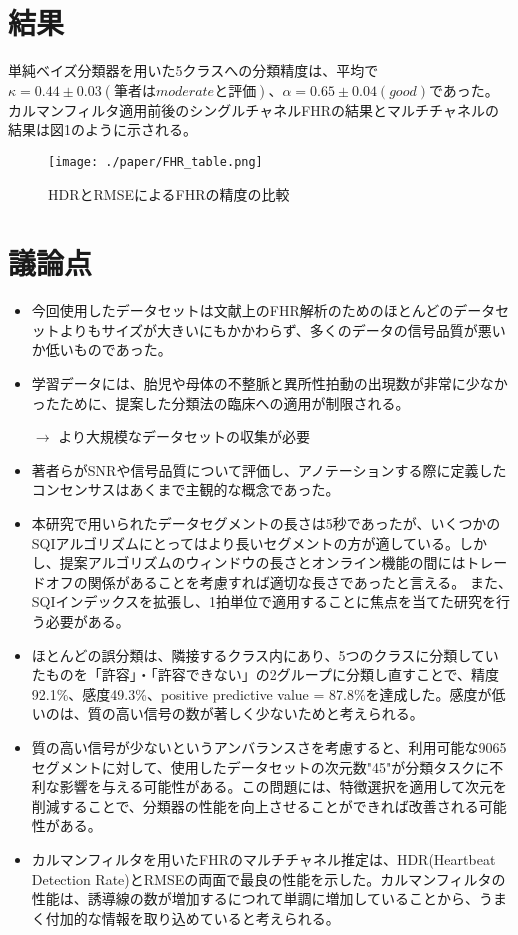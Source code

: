 \documentclass[dvipdfmx]{jsarticle}
\begin{document}
\section{結果}
単純ベイズ分類器を用いた5クラスへの分類精度は、平均で$\kappa = 0.44 \pm 0.03(筆者はmoderateと評価)、\alpha = 0.65 \pm 0.04(good)$であった。
カルマンフィルタ適用前後のシングルチャネルFHRの結果とマルチチャネルの結果は図1のように示される。

\begin{figure}[htbp]
\begin{center}
\texttt{[image: ./paper/FHR\_table.png]}
\end{center}
\caption{HDRとRMSEによるFHRの精度の比較}
\end{figure}

\section{議論点}
\begin{itemize}
    \item 今回使用したデータセットは文献上のFHR解析のためのほとんどのデータセットよりもサイズが大きいにもかかわらず、多くのデータの信号品質が悪いか低いものであった。
    \item  学習データには、胎児や母体の不整脈と異所性拍動の出現数が非常に少なかったために、提案した分類法の臨床への適用が制限される。

    $\rightarrow$ より大規模なデータセットの収集が必要
    \item 著者らがSNRや信号品質について評価し、アノテーションする際に定義したコンセンサスはあくまで主観的な概念であった。
    \item 本研究で用いられたデータセグメントの長さは5秒であったが、いくつかのSQIアルゴリズムにとってはより長いセグメントの方が適している。しかし、提案アルゴリズムのウィンドウの長さとオンライン機能の間にはトレードオフの関係があることを考慮すれば適切な長さであったと言える。
    また、SQIインデックスを拡張し、1拍単位で適用することに焦点を当てた研究を行う必要がある。
    \item ほとんどの誤分類は、隣接するクラス内にあり、5つのクラスに分類していたものを「許容」・「許容できない」の2グループに分類し直すことで、精度92.1\%、感度49.3\%、positive predictive value = 87.8\%を達成した。感度が低いのは、質の高い信号の数が著しく少ないためと考えられる。
    \item 質の高い信号が少ないというアンバランスさを考慮すると、利用可能な9065セグメントに対して、使用したデータセットの次元数"45"が分類タスクに不利な影響を与える可能性がある。この問題には、特徴選択を適用して次元を削減することで、分類器の性能を向上させることができれば改善される可能性がある。
    \item カルマンフィルタを用いたFHRのマルチチャネル推定は、HDR(Heartbeat Detection Rate)とRMSEの両面で最良の性能を示した。カルマンフィルタの性能は、誘導線の数が増加するにつれて単調に増加していることから、うまく付加的な情報を取り込めていると考えられる。
\end{itemize}
\end{document}
